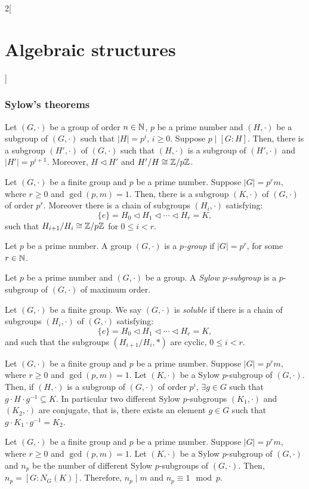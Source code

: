 \documentclass[../../../main.tex]{subfiles}
\begin{document}
\begin{multicols}{2}[\section{Algebraic structures}]
\subsubsection{Sylow's theorems}
\begin{corollary}
    Let $(G,\cdot)$ be a group of order $n\in\mathbb{N} $, $p$ be a prime number and $(H,\cdot)$ be a subgroup of $(G,\cdot)$ such that $|H|=p^i$, $i\geq 0$. Suppose $p\mid[G:H]$. Then, there is a subgroup $(H',\cdot)$ of $(G,\cdot)$ such that $(H,\cdot)$ is a subgroup of $(H',\cdot)$ and $|H'|=p^{i+1}$. Moreover, $H\lhd H'$ and $H'/H\cong\mathbb{Z} /p\mathbb{Z} $.
\end{corollary}
\begin{theorem}
    Let $(G,\cdot)$ be a finite group and $p$ be a prime number. Suppose $|G|=p^r m$, where $r\geq 0$ and $\gcd(p,m)=1$. Then, there is a subgroup $(K,\cdot)$ of $(G,\cdot)$ of order $p^r$. Moreover there is a chain of subgroups $(H_i,\cdot)$ satisfying: $$\{e\}=H_0\lhd H_1\lhd\cdots\lhd H_r=K,$$ such that $H_{i+1}/H_i\cong\mathbb{Z} /p\mathbb{Z} $ for $0\leq i<r$.
\end{theorem}
\begin{definition}
    Let $p$ be a prime number. A group $(G,\cdot)$ is a \textit{$p$-group} if $|G|=p^r$, for some $r\in\mathbb{N} $.
\end{definition}
\begin{definition}
    Let $p$ be a prime number and $(G,\cdot)$ be a group. A \textit{Sylow $p$-subgroup} is a $p$-subgroup of $(G,\cdot)$ of maximum order.
\end{definition}
\begin{definition}
    Let $(G,\cdot)$ be a finite group. We say $(G,\cdot)$ is \textit{soluble} if there is a chain of subgroups $(H_i,\cdot)$ of $(G,\cdot)$ satisfying: $$\{e\}=H_0\lhd H_1\lhd\cdots\lhd H_r=K,$$ and such that the subgroups $(H_{i+1}/H_i,*)$ are cyclic, $0\leq i<r$. 
\end{definition}
\begin{theorem}
    Let $(G,\cdot)$ be a finite group and $p$ be a prime number. Suppose $|G|=p^r m$, where $r\geq 0$ and $\gcd(p,m)=1$. Let $(K,\cdot)$ be a Sylow $p$-subgroup of $(G,\cdot)$. Then, if $(H,\cdot)$ is a subgroup of $(G,\cdot)$ of order $p^i$, $\exists g\in G$ such that $g\cdot H\cdot g^{-1}\subseteq K$. In particular two different Sylow $p$-subgroups $(K_1,\cdot)$ and $(K_2,\cdot)$ are conjugate, that is, there exists an element $g\in G$ such that $g\cdot K_1\cdot g^{-1}=K_2$.
\end{theorem}
\begin{theorem}
    Let $(G,\cdot)$ be a finite group and $p$ be a prime number. Suppose $|G|=p^r m$, where $r\geq 0$ and $\gcd(p,m)=1$. Let $(K,\cdot)$ be a Sylow $p$-subgroup of $(G,\cdot)$ and $n_p$ be the number of different Sylow $p$-subgroups of $(G,\cdot)$. Then, $n_p=[G:N_G(K)]$. Therefore, $n_p\mid m$ and $n_p\equiv1\mod p$. 
\end{theorem}

\end{multicols}
\end{document}
